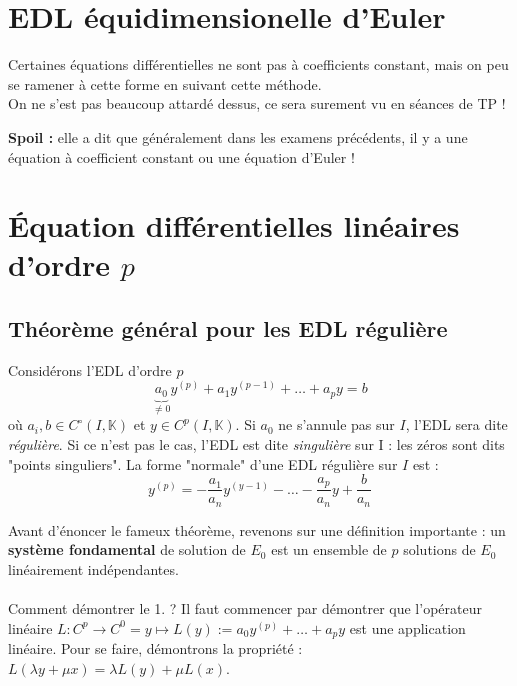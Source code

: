 \documentclass[british,french,11pt, a4paper, openany]{book}
\begin{document}
	
\section{EDL équidimensionelle d'Euler}
Certaines équations différentielles ne sont pas à coefficients constant, mais on peu se ramener à cette forme en suivant cette méthode.\\
On ne s'est pas beaucoup attardé dessus, ce sera surement vu en séances de TP !
	
\textbf{Spoil :} elle a dit que généralement dans les examens précédents, il y a une équation à coefficient constant ou une équation d'Euler ! 
	
\setcounter{section}{6}
\section{Équation différentielles linéaires d'ordre $p$}
\subsection{Théorème général pour les EDL régulière}
Considérons l'EDL d'ordre $p$
\begin{equation}
	\underbrace{a_0}_{\neq 0} y^{(p)} + a_1y^{(p-1)} + \dots + a_py = b
\end{equation}
où $a_i, b \in C^\circ(I, \mathbb{K})$ et $y \in C^p(I, \mathbb{K})$. Si $a_0$ ne s'annule pas sur $I$, l'EDL sera dite \textit{régulière}. Si ce n'est pas le cas, l'EDL est dite \textit{singulière} sur I : les zéros sont dits "points singuliers".
La forme "normale" d'une EDL régulière sur $I$ est :
\begin{equation}
	y^{(p)} = -\frac{a_1}{a_n}y^{(y-1)} - \dots - \frac{a_p}{a_n}y + \frac{b}{a_n}
\end{equation}
	
Avant d'énoncer le fameux théorème, revenons sur une définition importante : un \textbf{système fondamental} de solution de $E_0$ est un ensemble de $p$ solutions de $E_0$ linéairement indépendantes.\\
	
\ \\
Comment démontrer le 1. ? Il faut commencer par démontrer que l'opérateur linéaire $L : C^p \rightarrow C^0 = y \mapsto L(y) := a_0y^{(p)} + \dots + a_p y$ est une application linéaire. Pour se faire, démontrons la propriété : $L(\lambda y + \mu x) = \lambda L(y) + \mu L(x)$.
		
\end{document}
